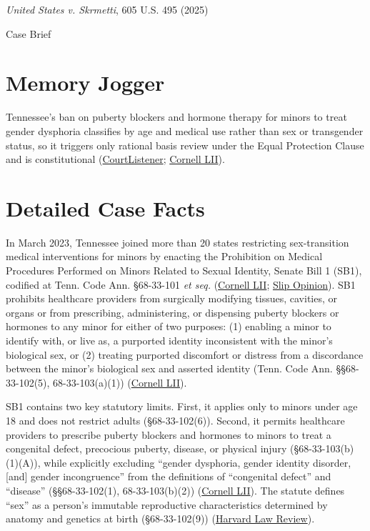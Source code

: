 \documentclass[12pt]{article}
\begin{document}
\begin{center}
{\LARGE \textit{United States v. Skrmetti}, 605 U.S. 495 (2025)\par}
\vspace{0.8em}
{\large Case Brief\par}
\end{center}
\vspace{1em}

\section{Memory Jogger}

Tennessee's ban on puberty blockers and hormone therapy for minors to treat gender dysphoria classifies by age and medical use rather than sex or transgender status, so it triggers only rational basis review under the Equal Protection Clause and is constitutional (\href{https://www.courtlistener.com/opinion/10776831/united-states-v-skrmetti/}{CourtListener}; \href{https://www.law.cornell.edu/supremecourt/text/23-477}{Cornell LII}).

\section{Detailed Case Facts}

In March 2023, Tennessee joined more than 20 states restricting sex-transition medical interventions for minors by enacting the Prohibition on Medical Procedures Performed on Minors Related to Sexual Identity, Senate Bill 1 (SB1), codified at Tenn. Code Ann. \S 68-33-101 \textit{et seq.} (\href{https://www.law.cornell.edu/supremecourt/text/23-477}{Cornell LII}; \href{https://www.supremecourt.gov/opinions/24pdf/23-477_2cp3.pdf}{Slip Opinion}). SB1 prohibits healthcare providers from surgically modifying tissues, cavities, or organs or from prescribing, administering, or dispensing puberty blockers or hormones to any minor for either of two purposes: (1) enabling a minor to identify with, or live as, a purported identity inconsistent with the minor's biological sex, or (2) treating purported discomfort or distress from a discordance between the minor's biological sex and asserted identity (Tenn. Code Ann. \S\S 68-33-102(5), 68-33-103(a)(1)) (\href{https://www.law.cornell.edu/supremecourt/text/23-477}{Cornell LII}).

SB1 contains two key statutory limits. First, it applies only to minors under age 18 and does not restrict adults (\S 68-33-102(6)). Second, it permits healthcare providers to prescribe puberty blockers and hormones to minors to treat a congenital defect, precocious puberty, disease, or physical injury (\S 68-33-103(b)(1)(A)), while explicitly excluding ``gender dysphoria, gender identity disorder, [and] gender incongruence'' from the definitions of ``congenital defect'' and ``disease'' (\S\S 68-33-102(1), 68-33-103(b)(2)) (\href{https://www.law.cornell.edu/supremecourt/text/23-477}{Cornell LII}). The statute defines ``sex'' as a person's immutable reproductive characteristics determined by anatomy and genetics at birth (\S 68-33-102(9)) (\href{https://harvardlawreview.org/print/vol-139/skrmetti-beyond-scrutiny/}{Harvard Law Review}).
\end{document}

